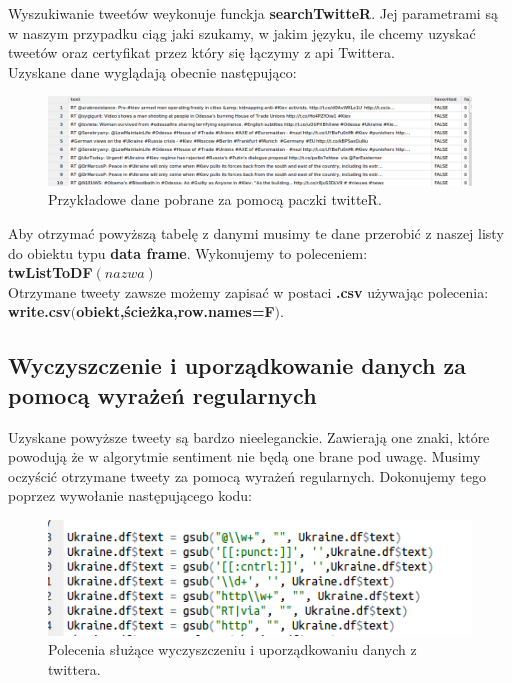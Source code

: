 \documentclass[12pt,a4paper]{report}
\begin{document}
Wyszukiwanie tweetów weykonuje funckja \textbf{searchTwitteR}. Jej parametrami są w naszym przypadku ciąg jaki szukamy, w jakim języku, ile chcemy uzyskać tweetów oraz certyfikat przez który się łączymy z api Twittera. \\
Uzyskane dane wyglądają obecnie następująco: \\
\begin{figure}[H]
\begin{center}
\includegraphics[scale=0.45]{pictures/Data1.png}
\caption{Przykładowe dane pobrane za pomocą paczki twitteR.}
\end{center}
\end{figure}

Aby otrzymać powyższą tabelę z danymi musimy te dane przerobić z naszej listy do obiektu typu \textbf{data frame}. Wykonujemy to poleceniem:\\ \textbf{twListToDF$(nazwa)$} \\
Otrzymane tweety zawsze możemy zapisać w postaci \textbf{.csv} używając polecenia: \\
\textbf{write.csv$($obiekt,ścieżka,row.names=F$)$}.

\subsection[Wyczyszczenie i uporządkowanie danych za pomocą wyrażeń regularnych]{Wyczyszczenie i uporządkowanie danych za pomocą wyrażeń regularnych}
Uzyskane powyższe tweety są bardzo nieeleganckie. Zawierają one znaki, które powodują że w algorytmie sentiment nie będą one brane pod uwagę. Musimy oczyścić otrzymane tweety za pomocą wyrażeń regularnych. Dokonujemy tego poprzez wywołanie następującego kodu: \\
\begin{figure}[H]
\begin{center}
\includegraphics[scale=0.5]{pictures/Code3.png}
\caption{Polecenia służące wyczyszczeniu i uporządkowaniu danych z twittera.}
\end{center}
\end{figure}
\end{document}
